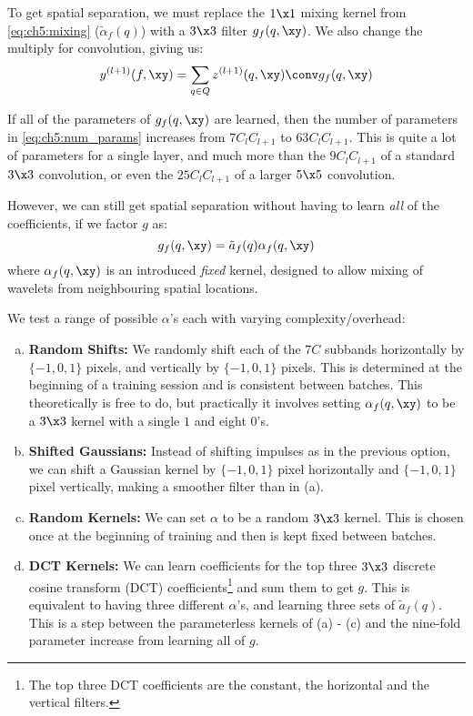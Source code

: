 To get spatial separation, we must replace the $1\x 1$ mixing kernel from
\eqref{eq:ch5:mixing} ($\tilde{\alpha}_f(q)$) with a $3\x 3$ filter $g_f(q,
\xy)$. We also change the multiply for convolution, giving us:
\begin{equation}
  y^{(l+1)}(f, \xy)  =  \sum_{q \in Q} z^{(l+1)}(q, \xy) \conv g_f(q, \xy)
\end{equation}

If all of the parameters of $g_f(q, \xy)$ are learned, then
the number of parameters in \eqref{eq:ch5:num_params} increases from $7C_l
C_{l+1}$ to $63C_l C_{l+1}$. This is quite a lot of parameters for a single
layer, and much more than the $9C_lC_{l+1}$ of a standard $3\x 3$ convolution, or
even the $25C_l C_{l+1}$ of a larger $5\x 5$ convolution.

However, we can still get spatial separation without having to learn \emph{all} of the
coefficients, if we factor $g$ as:
\begin{equation}
  g_f(q, \xy) = \tilde{a}_f(q) \alpha_f(q, \xy)
\end{equation}
where $\alpha_f(q, \xy)$ is an introduced \emph{fixed} kernel, designed to allow
mixing of wavelets from neighbouring spatial locations. 

We test a range of possible $\alpha$'s each with varying complexity/overhead:
\begin{enumerate}[(a)]
  \item \textbf{Random Shifts:} We randomly shift each of the $7C$ subbands horizontally
    by $\{-1, 0, 1\}$ pixels, and vertically by $\{-1, 0, 1\}$ pixels. This is
    determined at the beginning of a training session and is consistent between
    batches. This theoretically is free to do, but practically it involves
    setting $\alpha_f(q, \xy)$ to be a $3 \x 3$ kernel with a single $1$ and eight $0$'s.
  \item \textbf{Shifted Gaussians:} Instead of shifting impulses as in the previous option, we can shift a
    Gaussian kernel by $\{-1,0,1\}$ pixel horizontally and $\{-1, 0, 1\}$ pixel vertically, making a smoother 
    filter than in (a). 
  \item \textbf{Random Kernels:} We can set $\alpha$ to be a random $3\x 3$ kernel. This is chosen once
    at the beginning of training and then is kept fixed between batches.
  \item \textbf{DCT Kernels:} We can learn coefficients for the top three $3\x 3$ discrete cosine
    transform (DCT) coefficients\footnote{The top three DCT coefficients are the 
    constant, the horizontal and the vertical filters.} and
    sum them to get $g$.
    This is equivalent to having three different $\alpha$'s, and
    learning three sets of $\tilde{a}_f(q)$. This is a step between the
    parameterless kernels of (a) - (c) and the nine-fold parameter increase from 
    learning all of $g$. 
\end{enumerate}

